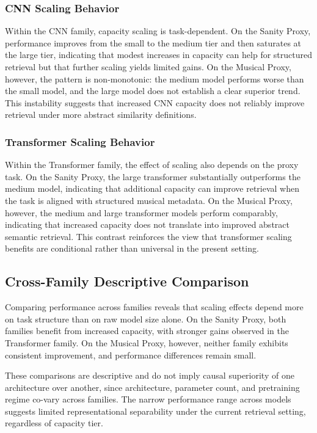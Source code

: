 \documentclass{article}
\begin{document}
\subsubsection{CNN Scaling Behavior}
Within the CNN family, capacity scaling is task-dependent. On the Sanity Proxy, performance improves
from the small to the medium tier and then saturates at the large tier, indicating that modest
increases in capacity can help for structured retrieval but that further scaling yields limited
gains. On the Musical Proxy, however, the pattern is non-monotonic: the medium model performs worse
than the small model, and the large model does not establish a clear superior trend. This instability
suggests that increased CNN capacity does not reliably improve retrieval under more abstract
similarity definitions.

\subsubsection{Transformer Scaling Behavior}
Within the Transformer family, the effect of scaling also depends on the proxy task. On the Sanity
Proxy, the large transformer substantially outperforms the medium model, indicating that additional
capacity can improve retrieval when the task is aligned with structured musical metadata. On the
Musical Proxy, however, the medium and large transformer models perform comparably, indicating that
increased capacity does not translate into improved abstract semantic retrieval. This contrast
reinforces the view that transformer scaling benefits are conditional rather than universal in the
present setting.

\subsection{Cross-Family Descriptive Comparison}
Comparing performance across families reveals that scaling effects depend more on task structure
than on raw model size alone. On the Sanity Proxy, both families benefit from increased capacity,
with stronger gains observed in the Transformer family. On the Musical Proxy, however, neither
family exhibits consistent improvement, and performance differences remain small.

These comparisons are descriptive and do not imply causal superiority of one architecture over
another, since architecture, parameter count, and pretraining regime co-vary across families.
The narrow performance range across models suggests limited representational separability under
the current retrieval setting, regardless of capacity tier.
\end{document}
